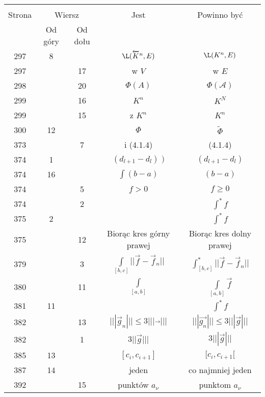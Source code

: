 \documentclass[a4paper,11pt]{article}
\begin{document}
\begin{center}
  \begin{tabular}{|c|c|c|c|c|}
    \hline
    & \multicolumn{2}{c|}{} & & \\
    Strona & \multicolumn{2}{c|}{Wiersz} & Jest
                              & Powinno być \\ \cline{2-3}
    & Od góry & Od dołu & & \\
    \hline
    297 &  8 & & $\L( \ola{ K }^{ n }, E )$ & $\L( K^{ n }, E )$ \\
    297 & & 17 & w $V$ & w $E$ \\
    298 & & 20 & $\Phi( A )$ & $\Phi( \mathcal{A} )$ \\
    299 & & 16 & $K^{ n }$ & $K^{ N }$ \\
    299 & & 15 & z $K^{ n }$ & $K^{ n }$ \\
    300 & 12 & & $\Phi$ & $\tilde{ \Phi }$ \\
    373 & &  7 & i (4.1.4) & (4.1.4) \\
    374 &  1 & & $( d_{ l + 1 } - d_{ l } )\; )$
           & $( d_{ l + 1 } - d_{ l } )$ \\
    374 & 16 & & $\int ( b - a )$ & $( b - a )$ \\
    374 & &  5 & $f > 0$ & $f \geq 0$ \\
    374 & &  2 & & $\int^{ * } \! f$ \\
    375 &  2 & & & $\int^{ * } \! f$ \\
    375 & & 12 & Biorąc kres górny prawej & Biorąc kres dolny prawej \\
    379 & &  3 & $\int\limits_{ [ b, c ]  } || \vec{ f } - \vec{ f }_{ n } ||$
           & $\int^{ * }_{ [ b, c ]  } || \vec{ f } - \vec{ f }_{ n } ||$ \\
    380 & & 11 & $\int\limits_{ [ a, b ] }$
           & $\int\limits_{ [ a, b ] } \vec{ f } $ \\
    381 & 11 & & & $\int^{ * } \! f$ \\
    382 & & 13 & $||| \vec g_{ n } ||| \leq 3 ||| \vec{ \; \; } |||$
           & $||| \vec{ g_{ n } } ||| \leq 3 ||| \vec{ g } |||$ \\
    382 & &  1 & $3 || \vec{ g } |||$ & $3 ||| \vec{ g } |||$ \\
    385 & 13 & & $[ c_{ i }, c_{ i + 1} ]$ & $[ c_{ i }, c_{ i + 1} [$ \\
    387 & 14 & & jeden & co najmniej jeden \\
    392 & & 15 & punktów $a_{ \nu }$ & punktom $a_{ \nu }$ \\
    \hline
  \end{tabular}


\end{center}
\end{document}
